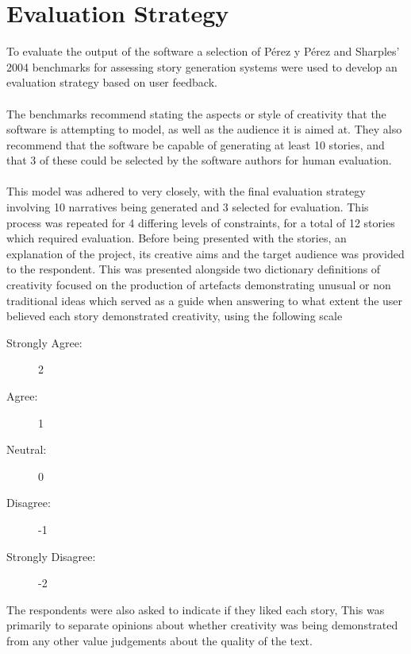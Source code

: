 \documentclass[letterpaper]{article}
\begin{document}
\section{Evaluation Strategy}
To evaluate the output of the software a selection of P\'erez y P\'erez and Sharples' 2004 benchmarks for assessing story generation systems were used to develop an evaluation strategy based on user feedback.\\
\\The benchmarks recommend stating the aspects or style of creativity that the software is attempting to model, as well as the audience it is aimed at. They also recommend that the software be capable of generating at least 10 stories, and that 3 of these could be selected by the software authors for human evaluation.\\ 
\\This model was adhered to very closely, with the final evaluation strategy involving 10 narratives being generated and 3 selected for evaluation. This process was repeated for 4 differing levels of constraints, for a total of 12 stories which required evaluation. Before being presented with the stories, an explanation of the project, its creative aims and the target audience was provided to the respondent. This was presented alongside two dictionary definitions of creativity focused on the production of artefacts demonstrating unusual or non traditional ideas which served as a guide when answering to what extent the user believed each story demonstrated creativity, using the following scale
\begin{description}
\item[Strongly Agree:] 2
\item[Agree:] 1
\item[Neutral:] 0
\item[Disagree:] -1
\item[Strongly Disagree:] -2
\end{description} 
The respondents were also asked to indicate if they liked each story, This was primarily to separate opinions about whether creativity was being demonstrated from any other value judgements about the quality of the text.
\end{document}
